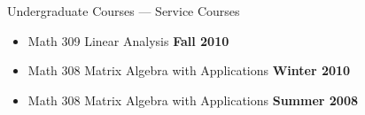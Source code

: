\documentclass[12pt]{amsart}
\newcommand{\esection}{\vspace{.3cm}}
\begin{document}
\textsf{Undergraduate Courses --- Service Courses}\begin{itemize}
\item Math 309 Linear Analysis \hfill \textbf{Fall 2010}
\item Math 308 Matrix Algebra with Applications \hfill \textbf{Winter 2010}
\item Math 308 Matrix Algebra with Applications \hfill \textbf{Summer 2008}
\end{itemize}





\esection

\thispagestyle{fancy}
\renewcommand{\headrulewidth}{0pt}
\lfoot{}
\cfoot{}
\end{document}
